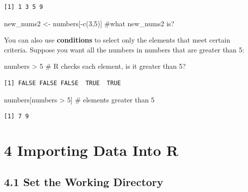 \documentclass[
  letterpaper,
  DIV=11,
  numbers=noendperiod]{scrreprt}
\newenvironment{Shaded}{\begin{snugshade}}{\end{snugshade}}
\newcommand{\CommentTok}[1]{\textcolor[rgb]{0.37,0.37,0.37}{#1}}
\newcommand{\DecValTok}[1]{\textcolor[rgb]{0.68,0.00,0.00}{#1}}
\newcommand{\FunctionTok}[1]{\textcolor[rgb]{0.28,0.35,0.67}{#1}}
\newcommand{\NormalTok}[1]{\textcolor[rgb]{0.00,0.23,0.31}{#1}}
\newcommand{\OtherTok}[1]{\textcolor[rgb]{0.00,0.23,0.31}{#1}}
\newcommand{\SpecialCharTok}[1]{\textcolor[rgb]{0.37,0.37,0.37}{#1}}
\begin{document}
\begin{verbatim}
[1] 1 3 5 9
\end{verbatim}

\begin{Shaded}
\begin{Highlighting}[]
\NormalTok{new\_nums2 }\OtherTok{\textless{}{-}}\NormalTok{ numbers[}\SpecialCharTok{{-}}\FunctionTok{c}\NormalTok{(}\DecValTok{3}\NormalTok{,}\DecValTok{5}\NormalTok{)] }\CommentTok{\#what new\_nums2 is? }
\end{Highlighting}
\end{Shaded}

You can also use \textbf{conditions} to select only the elements that
meet certain criteria. Suppose you want all the numbers in numbers that
are greater than 5:

\begin{Shaded}
\begin{Highlighting}[]
\NormalTok{numbers }\SpecialCharTok{\textgreater{}} \DecValTok{5}    \CommentTok{\# R checks each element, is it greater than 5? }
\end{Highlighting}
\end{Shaded}

\begin{verbatim}
[1] FALSE FALSE FALSE  TRUE  TRUE
\end{verbatim}

\begin{Shaded}
\begin{Highlighting}[]
\NormalTok{numbers[numbers }\SpecialCharTok{\textgreater{}} \DecValTok{5}\NormalTok{]  }\CommentTok{\# elements greater than 5 }
\end{Highlighting}
\end{Shaded}

\begin{verbatim}
[1] 7 9
\end{verbatim}

\section*{4 Importing Data Into R}\label{importing-data-into-r}


\subsection*{4.1 Set the Working
Directory}\label{set-the-working-directory}
\end{document}

